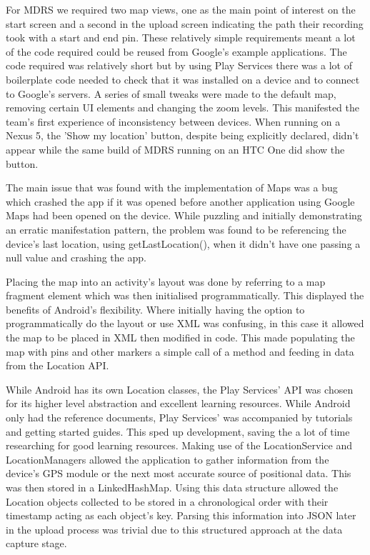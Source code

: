 \documentclass{l3proj}
\begin{document}
For MDRS we required two map views, one as the main point of interest on the start screen and a second in the upload screen indicating the path their recording took with a start and end pin. These relatively simple requirements meant a lot of the code required could be reused from Google's example applications. The code required was relatively short but by using Play Services there was a lot of boilerplate code needed to check that it was installed on a device and to connect to Google's servers. A series of small tweaks were made to the default map, removing certain UI elements and changing the zoom levels. This manifested the team's first experience of inconsistency between devices. When running on a Nexus 5, the 'Show my location' button, despite being explicitly declared, didn't appear while the same build of MDRS running on an HTC One did show the button.

The main issue that was found with the implementation of Maps was a bug which crashed the app if it was opened before another application using Google Maps had been opened on the device. While puzzling and initially demonstrating an erratic manifestation pattern, the problem was found to be referencing the device's last location, using getLastLocation(), when it didn't have one passing a null value and crashing the app.

Placing the map into an activity's layout was done by referring to a map fragment element which was then initialised programmatically. This displayed the benefits of Android's flexibility. Where initially having the option to programmatically do the layout or use XML was confusing, in this case it allowed the map to be placed in XML then modified in code. This made populating the map with pins and other markers a simple call of a method and feeding in data from the Location API.

While Android has its own Location classes, the Play Services' API was chosen for its higher level abstraction and excellent learning resources. While Android only had the reference documents, Play Services' was accompanied by tutorials and getting started guides. This sped up development, saving the a lot of time researching for good learning resources. Making use of the LocationService and LocationManagers allowed the application to gather information from the device's GPS module or the next most accurate source of positional data. This was then stored in a LinkedHashMap. Using this data structure allowed the Location objects collected to be stored in a chronological order with their timestamp acting as each object's key. Parsing this information into JSON later in the upload process was trivial due to this structured approach at the data capture stage.
\end{document}

